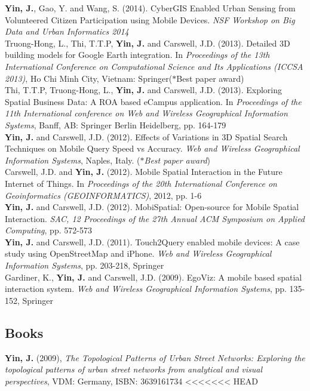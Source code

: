 \documentclass[11pt, a4paper]{article}
\newcommand{\years}[1]{\marginnote{\scriptsize #1}}
\begin{document}
\years{2014}\textbf{Yin, J.}, Gao, Y. and Wang, S. (2014). CyberGIS Enabled Urban Sensing from Volunteered Citizen Participation using Mobile Devices. \textit{NSF Workshop on Big Data and Urban Informatics 2014}\\
\years{2013}Truong-Hong, L., Thi, T.T.P, \textbf{Yin, J.} and Carswell, J.D. (2013). Detailed 3D building models for Google Earth integration. In \textit{Proceedings of the 13th International Conference on Computational Science and Its Applications (ICCSA 2013)}, Ho Chi Minh City, Vietnam: Springer($*$Best paper award)\\
\years{2013}Thi, T.T.P, Truong-Hong, L., \textbf{Yin, J.} and Carswell, J.D. (2013). Exploring Spatial Business Data: A ROA based eCampus application. In \textit{Proceedings of the 11th International conference on Web and Wireless Geographical Information Systems}, Banff, AB: Springer Berlin Heidelberg, pp. 164-179\\
\years{2012}\textbf{Yin, J.} and Carswell, J.D. (2012). Effects of Variations in 3D Spatial Search Techniques on Mobile Query Speed vs Accuracy. \textit{Web and Wireless Geographical Information Systems}, Naples, Italy. (\emph{$*$Best paper award})\\
\years{2012}Carswell, J.D. and \textbf{Yin, J.} (2012). Mobile Spatial Interaction in the Future Internet of Things. In \textit{Proceedings of the 20th International Conference on Geoinformatics (GEOINFORMATICS)}, 2012, pp. 1-6\\
\years{2012}\textbf{Yin, J.} and Carswell, J.D. (2012). MobiSpatial: Open-source for Mobile Spatial Interaction. \textit{SAC, 12 Proceedings of the 27th Annual ACM Symposium on Applied Computing}, pp. 572-573\\
\years{2012}\textbf{Yin, J.} and Carswell, J.D. (2011). Touch2Query enabled mobile devices: A case study using OpenStreetMap and iPhone. \textit{Web and Wireless Geographical Information Systems}, pp. 203-218, Springer\\
\years{2009} Gardiner, K., \textbf{Yin, J.} and Carswell, J.D. (2009). EgoViz: A mobile based spatial interaction system. \textit{Web and Wireless Geographical Information Systems}, pp. 135-152, Springer

\subsection*{Books}
\years{2009} \textbf{Yin, J.} (2009), \emph{The Topological Patterns of Urban Street Networks: Exploring the topological patterns of urban street networks from analytical and visual perspectives}, VDM: Germany, ISBN: 3639161734
<<<<<<< HEAD
\end{document}
